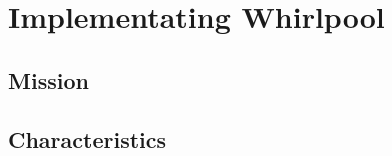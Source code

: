 \chapter{Implementating Whirlpool} \label{implwhirlpool}
\section{Mission}
\section{Characteristics}

\pagebreak